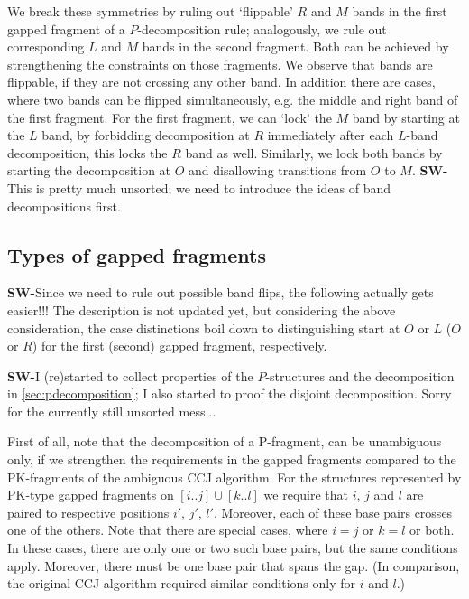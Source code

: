 \documentclass[11pt]{article} %
\newcommand{\SW}[1]{\textbf{SW-}#1}
\begin{document}
We break these symmetries by ruling out `flippable' $R$ and $M$ bands in the first gapped fragment of a $P$-decomposition rule; analogously, we rule out corresponding $L$ and $M$ bands in the second fragment. Both can be achieved by strengthening the constraints on those fragments.
We observe that bands are flippable, if they are not crossing any other band. In addition there are cases, where two bands can be flipped simultaneously, e.g. the middle and right band of the first fragment.
For the first fragment, we can `lock' the $M$ band by starting at the $L$ band, by forbidding decomposition at $R$ immediately after each $L$-band decomposition, this locks the $R$ band as well. Similarly, we lock both bands by starting the decomposition at $O$ and disallowing transitions from $O$ to $M$. \SW{This is pretty much unsorted; we need to introduce the ideas of band decompositions first.}

\subsection{Types of gapped fragments}

\SW{Since we need to rule out possible band flips, the following actually gets easier!!! The description is not updated yet, but considering the above consideration, the case distinctions boil down to distinguishing start at $O$ or $L$ ($O$ or $R$) for the first (second) gapped fragment, respectively.}

\SW{I (re)started to collect properties of the $P$-structures and the decomposition in 
\ref{sec:pdecomposition}; I also started to proof the disjoint decomposition. Sorry for the currently still unsorted mess...}

First of all, note that the decomposition of a P-fragment, can be unambiguous
only, if we strengthen the requirements in the gapped fragments compared to the
PK-fragments of the ambiguous CCJ algorithm.  For the structures represented by
PK-type gapped fragments on $[i..j]\cup[k..l]$ we require that $i$, $j$ and $l$
are paired to respective positions $i'$, $j'$, $l'$. Moreover, each of these
base pairs crosses one of the others.  Note that there are special
cases, where $i=j$ or $k=l$ or both. In these cases, there are only one or two
such base pairs, but the same conditions apply. Moreover, there must be one
base pair that spans the gap. (In comparison, the original CCJ algorithm
required similar conditions only for $i$ and $l$.)
\end{document}
